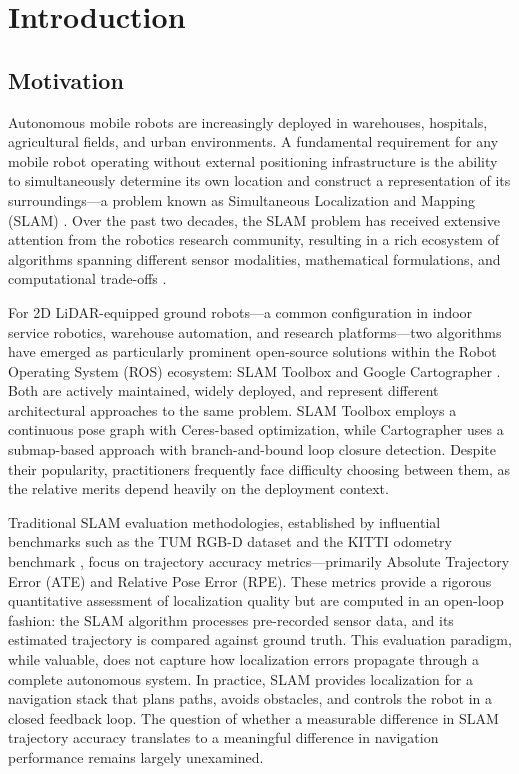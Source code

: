 \chapter{Introduction}
\label{ch:introduction}

\section{Motivation}

Autonomous mobile robots are increasingly deployed in warehouses, hospitals, agricultural fields, and urban environments. A fundamental requirement for any mobile robot operating without external positioning infrastructure is the ability to simultaneously determine its own location and construct a representation of its surroundings---a problem known as Simultaneous Localization and Mapping (SLAM) \citep{thrun2005probabilistic}. Over the past two decades, the SLAM problem has received extensive attention from the robotics research community, resulting in a rich ecosystem of algorithms spanning different sensor modalities, mathematical formulations, and computational trade-offs \citep{grisetti2010gmapping, dellaert2017factor}.

For 2D LiDAR-equipped ground robots---a common configuration in indoor service robotics, warehouse automation, and research platforms---two algorithms have emerged as particularly prominent open-source solutions within the Robot Operating System (ROS) ecosystem: SLAM Toolbox \citep{macenski2021slam} and Google Cartographer \citep{hess2016cartographer}. Both are actively maintained, widely deployed, and represent different architectural approaches to the same problem. SLAM Toolbox employs a continuous pose graph with Ceres-based optimization, while Cartographer uses a submap-based approach with branch-and-bound loop closure detection. Despite their popularity, practitioners frequently face difficulty choosing between them, as the relative merits depend heavily on the deployment context.

Traditional SLAM evaluation methodologies, established by influential benchmarks such as the TUM RGB-D dataset \citep{sturm2012benchmark} and the KITTI odometry benchmark \citep{geiger2013kitti}, focus on trajectory accuracy metrics---primarily Absolute Trajectory Error (ATE) and Relative Pose Error (RPE). These metrics provide a rigorous quantitative assessment of localization quality but are computed in an open-loop fashion: the SLAM algorithm processes pre-recorded sensor data, and its estimated trajectory is compared against ground truth. This evaluation paradigm, while valuable, does not capture how localization errors propagate through a complete autonomous system. In practice, SLAM provides localization for a navigation stack that plans paths, avoids obstacles, and controls the robot in a closed feedback loop. The question of whether a measurable difference in SLAM trajectory accuracy translates to a meaningful difference in navigation performance remains largely unexamined.

